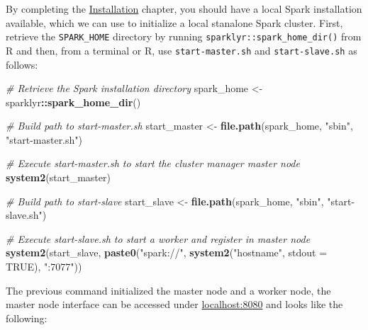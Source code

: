 \documentclass[]{book}
\newenvironment{Shaded}{\begin{snugshade}}{\end{snugshade}}
\newcommand{\CommentTok}[1]{\textcolor[rgb]{0.56,0.35,0.01}{\textit{#1}}}
\newcommand{\DataTypeTok}[1]{\textcolor[rgb]{0.13,0.29,0.53}{#1}}
\newcommand{\KeywordTok}[1]{\textcolor[rgb]{0.13,0.29,0.53}{\textbf{#1}}}
\newcommand{\NormalTok}[1]{#1}
\newcommand{\OperatorTok}[1]{\textcolor[rgb]{0.81,0.36,0.00}{\textbf{#1}}}
\newcommand{\OtherTok}[1]{\textcolor[rgb]{0.56,0.35,0.01}{#1}}
\newcommand{\StringTok}[1]{\textcolor[rgb]{0.31,0.60,0.02}{#1}}
\theoremstyle{definition}
\theoremstyle{definition}
\theoremstyle{definition}
\theoremstyle{remark}
\begin{document}
By completing the \protect\hyperlink{installation}{Installation}
chapter, you should have a local Spark installation available, which we
can use to initialize a local stanalone Spark cluster. First, retrieve
the \texttt{SPARK\_HOME} directory by running
\texttt{sparklyr::spark\_home\_dir()} from R and then, from a terminal
or R, use \texttt{start-master.sh} and \texttt{start-slave.sh} as
follows:

\begin{Shaded}
\begin{Highlighting}[]
\CommentTok{# Retrieve the Spark installation directory}
\NormalTok{spark_home <-}\StringTok{ }\NormalTok{sparklyr}\OperatorTok{::}\KeywordTok{spark_home_dir}\NormalTok{()}

\CommentTok{# Build path to start-master.sh}
\NormalTok{start_master <-}\StringTok{ }\KeywordTok{file.path}\NormalTok{(spark_home, }\StringTok{"sbin"}\NormalTok{, }\StringTok{"start-master.sh"}\NormalTok{)}

\CommentTok{# Execute start-master.sh to start the cluster manager master node}
\KeywordTok{system2}\NormalTok{(start_master)}

\CommentTok{# Build path to start-slave}
\NormalTok{start_slave <-}\StringTok{ }\KeywordTok{file.path}\NormalTok{(spark_home, }\StringTok{"sbin"}\NormalTok{, }\StringTok{"start-slave.sh"}\NormalTok{)}

\CommentTok{# Execute start-slave.sh to start a worker and register in master node}
\KeywordTok{system2}\NormalTok{(start_slave, }\KeywordTok{paste0}\NormalTok{(}\StringTok{"spark://"}\NormalTok{, }\KeywordTok{system2}\NormalTok{(}\StringTok{"hostname"}\NormalTok{, }\DataTypeTok{stdout =} \OtherTok{TRUE}\NormalTok{), }\StringTok{":7077"}\NormalTok{))}
\end{Highlighting}
\end{Shaded}

The previous command initialized the master node and a worker node, the
master node interface can be accessed under
\href{http://localhost:8080}{localhost:8080} and looks like the
following:
\end{document}

